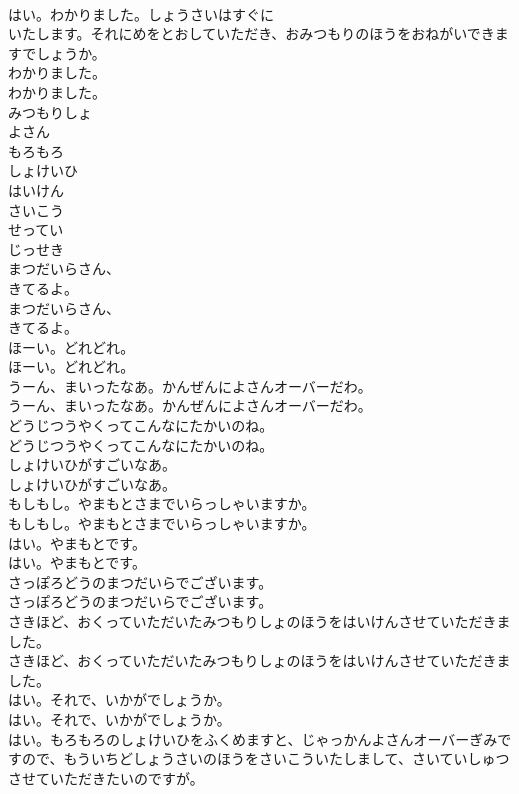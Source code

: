 \documentclass[8pt]{extreport}
\begin{document}
\begin{CJK}{UTF8}{min}
\\	はい。わかりました。しょうさいはすぐに
\\	いたします。それにめをとおしていただき、おみつもりのほうをおねがいできますでしょうか。
\\	わかりました。
\\	わかりました。
\\	みつもりしょ
\\	よさん
\\	もろもろ
\\	しょけいひ
\\	はいけん
\\	さいこう
\\	せってい
\\	じっせき
\\	まつだいらさん、
\\	きてるよ。
\\	まつだいらさん、
\\	きてるよ。
\\	ほーい。どれどれ。
\\	ほーい。どれどれ。
\\	うーん、まいったなあ。かんぜんによさんオーバーだわ。
\\	うーん、まいったなあ。かんぜんによさんオーバーだわ。
\\	どうじつうやくってこんなにたかいのね。
\\	どうじつうやくってこんなにたかいのね。
\\	しょけいひがすごいなあ。
\\	しょけいひがすごいなあ。
\\	もしもし。やまもとさまでいらっしゃいますか。
\\	もしもし。やまもとさまでいらっしゃいますか。
\\	はい。やまもとです。
\\	はい。やまもとです。
\\	さっぽろどうのまつだいらでございます。
\\	さっぽろどうのまつだいらでございます。
\\	さきほど、おくっていただいたみつもりしょのほうをはいけんさせていただきました。
\\	さきほど、おくっていただいたみつもりしょのほうをはいけんさせていただきました。
\\	はい。それで、いかがでしょうか。
\\	はい。それで、いかがでしょうか。
\\	はい。もろもろのしょけいひをふくめますと、じゃっかんよさんオーバーぎみですので、もういちどしょうさいのほうをさいこういたしまして、さいていしゅつさせていただきたいのですが。

\end{CJK}
\end{document}
